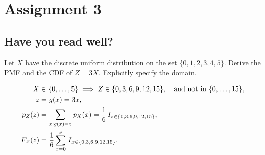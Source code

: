 \documentclass[assignments]{subfiles}
\begin{document}
\section{Assignment 3}
\label{sec:assignment-3}


\subsection{Have you read well?}
\label{sec:have-you-read-1}


\begin{exercise}
Let $X$ have the discrete uniform distribution on the set $\{0, 1, 2, 3, 4, 5\}$. Derive the PMF and the CDF of $Z=3X$. Explicitly specify the domain.
\begin{solution}
  \begin{align}
    \label{eq:17}
    X &\in \{0, \ldots, 5\} \implies Z \in \{0, 3, 6, 9, 12, 15\}, \quad \text{and not in } \{0, \ldots, 15\},\\
z &= g(x) = 3x,\\
p_{Z}(z) &= \sum_{x: g(x) =z } p_{X}(x) = \frac{1}{6} \,I_{z \in \{0, 3, 6, 9, 12, 15\}}, \\
F_{Z}(z) &=\frac{1}{6} \sum_{x=0}^{z} \,I_{x \in \{0, 3, 6, 9, 12, 15\}}.
  \end{align}
\end{solution}
\end{exercise}
\end{document}
